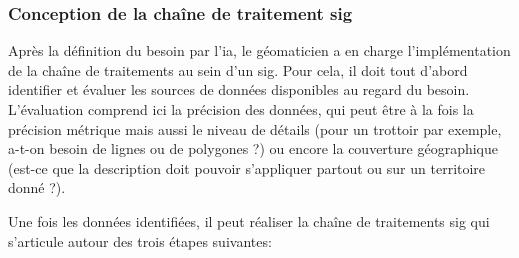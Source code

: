 \subsubsection{Conception de la chaîne de traitement \gls{sig}}

\label{sec:conception_chaine_sig}

Après la définition du besoin par l’\gls{ia}, le géomaticien a en charge l’implémentation de la chaîne de traitements au sein d’un \gls{sig}. Pour cela, il doit tout d’abord identifier et évaluer les sources de données disponibles au regard du besoin. L’évaluation comprend ici la précision des données, qui peut être à la fois la précision métrique mais aussi le niveau de détails (pour un trottoir par exemple, a-t-on besoin de lignes ou de polygones ?) ou encore la couverture géographique (est-ce que la description doit pouvoir s’appliquer partout ou sur un territoire donné ?).

\newpar{}

Une fois les données identifiées, il peut réaliser la chaîne de traitements \gls{sig} qui s’articule autour des trois étapes suivantes:

